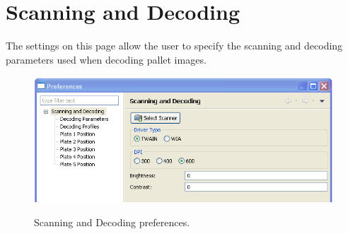 \section{Scanning and Decoding}
\label{sec:scanning_and_decoding}
The settings on this page allow the user to specify the scanning and
decoding parameters used when decoding pallet images.
    \begin{figure}[H]
      \centering
      \scalebox{0.5}
      { \includegraphics*{screenshots/configuration/prefs_scanning_and_decoding} }
      \caption{Scanning and Decoding preferences.}
      \label{fig:prefs_scanning_and_decoding}
    \end{figure}
